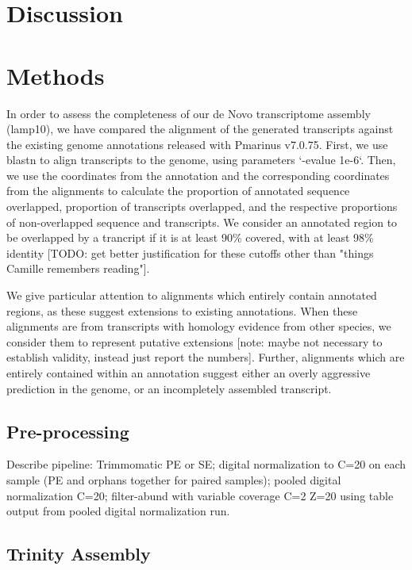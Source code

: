 \documentclass[10pt,twocolumn,linenumbers]{article}
\begin{document}


\section*{Discussion}

\section*{Methods}


In order to assess the completeness of our de Novo transcriptome assembly (lamp10), we have compared
the alignment of the generated transcripts against the existing genome annotations released with
Pmarinus v7.0.75. First, we use blastn to align transcripts to the genome, using parameters 
`-evalue 1e-6`. Then, we use the coordinates from the annotation and the corresponding coordinates 
from the alignments to calculate the proportion of annotated sequence overlapped, proportion of
transcripts overlapped, and the respective proportions of non-overlapped sequence and transcripts.
We consider an annotated region to be overlapped by a trancript if it is at least 90\% covered, with
at least 98\% identity [TODO: get better justification for these cutoffs other than "things Camille 
remembers reading"].

We give particular attention to alignments which entirely contain annotated regions, as these
suggest extensions to existing annotations. When these alignments are from transcripts with homology
evidence from other species, we consider them to represent putative extensions [note: maybe not
necessary to establish validity, instead just report the numbers]. Further, alignments which are 
entirely contained within an annotation suggest either an overly aggressive prediction in the genome, 
or an incompletely assembled transcript.

\subsection*{Pre-processing}

Describe pipeline: Trimmomatic PE or SE; digital normalization to C=20 on each sample (PE and
orphans together for paired samples); pooled digital normalization C=20; filter-abund with variable
coverage C=2 Z=20 using table output from pooled digital normalization run.

\subsection*{Trinity Assembly}
\end{document}

